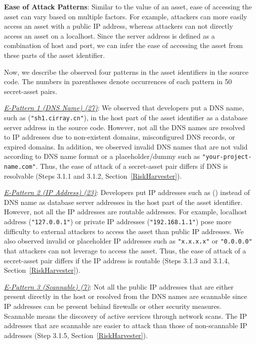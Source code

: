 \textbf{Ease of Attack Patterns}: Similar to the value of an asset, ease of accessing the asset can vary based on multiple factors. For example, attackers can more easily access an asset with a public IP address, whereas attackers can not directly access an asset on a localhost. Since the server address is defined as a combination of host and port, we can infer the ease of accessing the asset from these parts of the asset identifier. 

Now, we describe the observed four patterns in the asset identifiers in the source code. The numbers in parentheses denote occurrences of each pattern in 50 secret-asset pairs.

\textit{\uline{E-Pattern 1 (DNS Name) (27)}}: We observed that developers put a DNS name, such as (\texttt{"sh1.cirray.cn"}), in the host part of the asset identifier as a database server address in the source code. However, not all the DNS names are resolved to IP addresses due to non-existent domains, misconfigured DNS records, or expired domains. In addition, we observed invalid DNS names that are not valid according to DNS name format or a placeholder/dummy such as \texttt{"your-project-name.com"}. Thus, the ease of attack of a secret-asset pair differs if DNS is resolvable (Steps 3.1.1 and 3.1.2, Section~\ref{RiskHarvester}).

\textit{\uline{E-Pattern 2 (IP Address) (23)}}: Developers put IP addresses such as (\texttt{}) instead of DNS name as database server addresses in the host part of the asset identifier. However, not all the IP addresses are routable addresses. For example, localhost address (\texttt{"127.0.0.1"}) or private IP addresses (\texttt{"192.168.1.1"}) pose more difficulty to external attackers to access the asset than public IP addresses. We also observed invalid or placeholder IP addresses such as \texttt{"x.x.x.x"} or \texttt{"0.0.0.0"} that attackers can not leverage to access the asset. Thus, the ease of attack of a secret-asset pair differs if the IP address is routable (Steps 3.1.3 and 3.1.4, Section~\ref{RiskHarvester}).

\textit{\uline{E-Pattern 3 (Scannable) (7)}}: Not all the public IP addresses that are either present directly in the host or resolved from the DNS names are scannable since IP addresses can be present behind firewalls or other security measures. Scannable means the discovery of active services through network scans. The IP addresses that are scannable are easier to attack than those of non-scannable IP addresses (Step 3.1.5, Section~\ref{RiskHarvester}).


